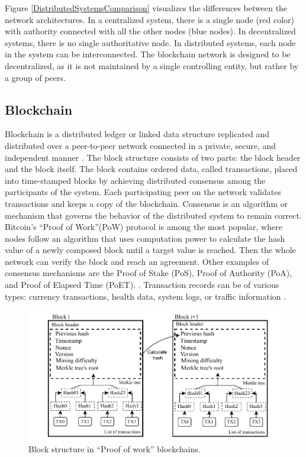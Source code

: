 \noindent Figure \ref{DistributedSystemsComparison} visualizes the differences between the network architectures. In a centralized system, there is a single node (red color) with authority connected with all the other nodes (blue nodes). In decentralized systems, there is no single authoritative node. In distributed systems, each node in the system can be interconnected. The blockchain network is designed to be decentralized, as it is not maintained by a single controlling entity, but rather by a group of peers. 

\subsection{Blockchain}
\label{blockchain}
Blockchain is a distributed ledger or linked data structure replicated and distributed over a peer-to-peer network connected in a private, secure, and independent manner \cite{BeyondBitcoin}. The block structure consists of two parts: the block header and the block itself. The block contains ordered data, called transactions, placed into time-stamped blocks by achieving distributed consensus among the participants of the system. Each participating peer on the network validates transactions and keeps a copy of the blockchain. Consensus is an algorithm or mechanism that governs the behavior of the distributed system to remain correct. Bitcoin's ``Proof of Work''(PoW) protocol is among the most popular, where nodes follow an algorithm that uses computation power to calculate the hash value of a newly composed block until a target value is reached. Then the whole network can verify the block and reach an agreement. Other examples of consensus mechanisms are the Proof of Stake (PoS), Proof of Authority (PoA), and Proof of Elapsed Time (PoET). \cite{ConsensusInTheWild}. Transaction records can be of various types: currency transactions, health data, system logs, or traffic information \cite{HybridBlockchainIdentityAuthentication}. 

\begin{figure}[h]
	\centering
	\includegraphics[width=\linewidth]{obrazky-figures/BlockchainArchitecture.pdf}
	\caption{Block structure in ``Proof of work'' blockchains.}
	\label{BlockchainArchitecture}
\end{figure}

